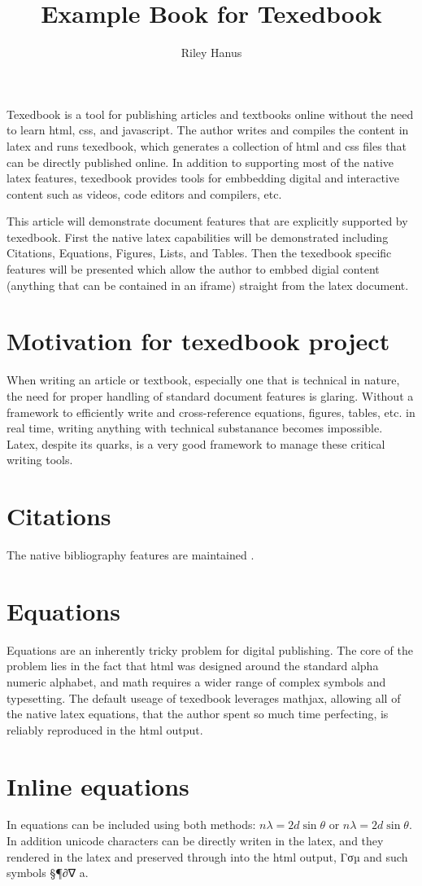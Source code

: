 \documentclass{book}
\title{Example Book for Texedbook}
\author{Riley Hanus}
\begin{document}
 
\maketitle

Texedbook is a tool for publishing articles and textbooks online without the need to learn html, css, and javascript. The author writes and compiles the content in latex and runs texedbook, which generates a collection of html and css files that can be directly published online. In addition to supporting most of the native latex features, texedbook provides tools for embbedding digital and interactive content such as videos, code editors and compilers, etc. 

This article will demonstrate  document features that are explicitly supported by texedbook.  First the native latex capabilities will be demonstrated including Citations, Equations, Figures, Lists, and Tables. Then the texedbook specific features will be presented which allow the author to embbed digial content (anything that can be contained in an iframe) straight from the latex document. 

\chapter{Motivation for texedbook project}

When writing an article or textbook, especially one that is technical in nature, the need for proper handling of standard document features is glaring. Without a framework to efficiently write and cross-reference equations, figures, tables, etc. in real time, writing anything with technical substanance becomes impossible. Latex, despite its quarks, is a very good framework to manage these critical writing tools.

\chapter{Citations}
The native bibliography features are maintained \cite{Ohno2007}. 

\chapter{Equations}
Equations are an inherently tricky problem for digital publishing. The core of the problem lies in the fact that html was designed around the standard alpha numeric alphabet, and math requires a wider range of complex symbols and typesetting. The default useage of texedbook leverages mathjax, allowing all of the native latex equations, that the author spent so much time perfecting, is reliably reproduced in the html output.


\chapter{Inline equations}
In equations can be included using both methods: $n\lambda=2d \sin \theta$ or \( n\lambda=2d \sin \theta \). In addition unicode characters can be directly writen in the latex, and they rendered in the latex and preserved through into the html output, 
Γσµ and such symbols §¶∂∇ a.



\end{document}
